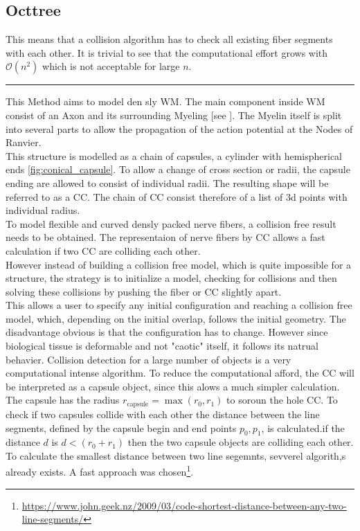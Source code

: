 \subsection{Octtree}
% 
This means that a collision algorithm has to check all existing fiber segments with each other.
It is trivial to see that the computational effort grows with $\mathcal{O}(n^{2})$ which is not acceptable for large $n$.
% 
% 
% 
\vspace{5pt}
\hrule
\vspace{6pt}
% 
\newpage
% 
% 
% 
This Method aims to model den sly \ac{WM}.
The main component inside \ac{WM} consist of an Axon and its surrounding Myeling [see \dummy].
The Myelin itself is split into several parts to allow the propagation of the action potential at the Nodes of Ranvier. 
\\
% 
This structure is modelled as a chain of capsules, a cylinder with hemispherical ends \cref{fig:conical_capsule}.
To allow a change of cross section or radii, the capsule ending are allowed to consist of individual radii.
The resulting shape will be referred to as a \ac{CC}.
The chain of \ac{CC} consist therefore of a list of 3d points with individual radius. 
\\
% 
To model flexible and curved densly packed nerve fibers, a collision free result needs to be obtained.
The representaion of nerve fibers by \ac{CC} allows a fast calculation if two \ac{CC} are colliding each other. 
\\
% 
However instead of building a collision free model, which is quite impossible for a \dummy structure, the strategy is to initialize a model, checking for collisions and then solving these collisions by pushing the fiber or \ac{CC} slightly apart. 
\\
% 
This allows a user to specify any initial configuration and reaching a collision free model, which, depending on the initial overlap, follows the initial geometry.
The disadvantage obvious is that the configuration has to change.
However since biological tissue is deformable and not "caotic" itself, it follows its natrual behavier.
%
% 
% 
% 
Collision detection for a large number of objects is a very computational intense algorithm.
To reduce the computational afford, the \ac{CC} will be interpreted as a capsule object, since this alows a much simpler calculation.
The capsule has the radius $r_{\text{capsule}} = \max(r_0, r_1)$ to soroun the hole \ac{CC}.
To check if two capsules collide with each other the distance between the line segments, defined by the capsule begin and end points $p_0, p_1$, is calculated.if the distance $d$ is $d < (r_0 + r_1)$ then the two capsule objects are colliding each other. \\
% 
To calculate the smallest distance between two line segemnts, sevverel algorith,s already exists.
A fast approach was chosen\footnote{\href{https://www.john.geek.nz/2009/03/code-shortest-distance-between-any-two-line-segments/}{https://www.john.geek.nz/2009/03/code-shortest-distance-between-any-two-line-segments/}}.
%
